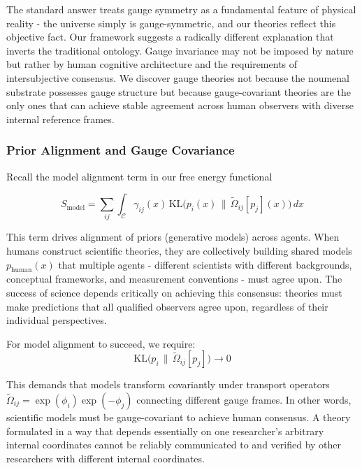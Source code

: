 \documentclass[11pt]{article}
\begin{document}
The standard answer treats gauge symmetry as a fundamental feature of physical reality - the universe simply is gauge-symmetric, and our theories reflect this objective fact. Our framework suggests a radically different explanation that inverts the traditional ontology. Gauge invariance may not be imposed by nature but rather by human cognitive architecture and the requirements of intersubjective consensus. We discover gauge theories not because the noumenal substrate possesses gauge structure but because gauge-covariant theories are the only ones that can achieve stable agreement across human observers with diverse internal reference frames.


\subsubsection{Prior Alignment and Gauge Covariance}

Recall the model alignment term in our free energy functional

\begin{equation}
S_{\text{model}} = \sum_{ij} \int_{\mathcal{C}} \gamma_{ij}(x) \, \mathrm{KL}\big(p_i(x) \,\|\, \tilde{\Omega}_{ij}[p_j](x)\big) \, dx
\end{equation}

This term drives alignment of priors (generative models) across agents. When humans construct scientific theories, they are collectively building shared models $p_{\text{human}}(x)$ that multiple agents - different scientists with different backgrounds, conceptual frameworks, and measurement conventions - must agree upon. The success of science depends critically on achieving this consensus: theories must make predictions that all qualified observers agree upon, regardless of their individual perspectives.

For model alignment to succeed, we require:
\begin{equation}
\mathrm{KL}\big(p_i \,\|\, \tilde{\Omega}_{ij}[p_j]\big) \to 0
\end{equation}

This demands that models transform covariantly under transport operators $\tilde{\Omega}_{ij} = \exp(\phi_i)\exp(-\phi_j)$ connecting different gauge frames. In other words, scientific models must be gauge-covariant to achieve human consensus. A theory formulated in a way that depends essentially on one researcher's arbitrary internal coordinates cannot be reliably communicated to and verified by other researchers with different internal coordinates.
\end{document}
